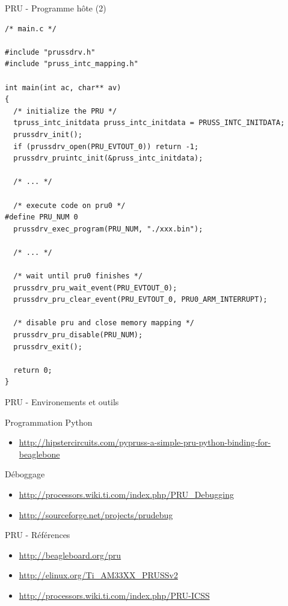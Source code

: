 \documentclass{beamer}
\begin{document}
\begin{frame}[containsverbatim]{PRU - Programme h\^ote (2)}
 \begin{tiny}
   \lstset{language=C++}
   \begin{lstlisting}[frame=tb]
/* main.c */

#include "prussdrv.h"
#include "pruss_intc_mapping.h"

int main(int ac, char** av)
{
  /* initialize the PRU */
  tpruss_intc_initdata pruss_intc_initdata = PRUSS_INTC_INITDATA;
  prussdrv_init();
  if (prussdrv_open(PRU_EVTOUT_0)) return -1;
  prussdrv_pruintc_init(&pruss_intc_initdata);

  /* ... */

  /* execute code on pru0 */
#define PRU_NUM 0
  prussdrv_exec_program(PRU_NUM, "./xxx.bin");

  /* ... */

  /* wait until pru0 finishes */
  prussdrv_pru_wait_event(PRU_EVTOUT_0);
  prussdrv_pru_clear_event(PRU_EVTOUT_0, PRU0_ARM_INTERRUPT);

  /* disable pru and close memory mapping */
  prussdrv_pru_disable(PRU_NUM);
  prussdrv_exit();

  return 0;
}
 \end{lstlisting}
 \end{tiny}
\end{frame}


\begin{frame}{PRU - Environements et outils}
  \begin{tiny}
    Programmation Python
    \begin{itemize}
    \item \url{http://hipstercircuits.com/pypruss-a-simple-pru-python-binding-for-beaglebone}\newline
    \end{itemize}

    D\'eboggage
    \begin{itemize}
    \item \url{http://processors.wiki.ti.com/index.php/PRU_Debugging}
    \item \url{http://sourceforge.net/projects/prudebug}
    \end{itemize}

  \end{tiny}
\end{frame}


\begin{frame}{PRU - R\'ef\'erences}
  \begin{small}
    \begin{itemize}
    \item \url{http://beagleboard.org/pru}
    \item \url{http://elinux.org/Ti_AM33XX_PRUSSv2}
    \item \url{http://processors.wiki.ti.com/index.php/PRU-ICSS}
    \end{itemize}
  \end{small}
\end{frame}
\end{document}
